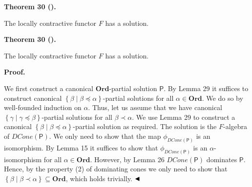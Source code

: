 \documentclass[10pt,a4paper]{article}
\begin{document}
 
 
\par\medskip\noindent\textbf{Theorem 30 ().}\par
 
 
The locally contractive functor $F$ has a solution.\par
 
 
 

 
\par\medskip\noindent\textbf{Theorem 30 ().}\par
 
 
The locally contractive functor $F$ has a solution.\par
 
 

 
 

 
\par\medskip\noindent\textbf{Proof.}\par
 
 
We first construct a canonical $\mathbf{Ord}$-partial solution $\boldsymbol{\mathsf{P}}$. By Lemma 29 it suffices to construct canonical $\left\{\beta\middle|\beta\preceq\alpha\right\}$-partial solutions for all $\alpha\in\mathbf{Ord}$. We do so by well-founded induction on $\alpha$. Thus, let us assume that we have canonical $\left\{\gamma\middle|\gamma\preceq\beta\right\}$-partial solutions for all $\beta\prec\alpha$. We use Lemma 29 to construct a canonical $\left\{\beta\middle|\beta\preceq\alpha\right\}$-partial solution as required. The solution is the $F$-algebra of $\mathit{DCone}(\boldsymbol{\mathsf{P}})$. We only need to show that the map $\phi_{\mathit{DCone}(\boldsymbol{\mathsf{P}})}$ is an isomorphism. By Lemma 15 it suffices to show that $\phi_{\mathit{DCone}(\boldsymbol{\mathsf{P}})}$ is an $\alpha$-isomorphism for all $\alpha\in\mathbf{Ord}$. However, by Lemma 26 $\mathit{DCone}(\boldsymbol{\mathsf{P}})$ dominates $\boldsymbol{\mathsf{P}}$. Hence, by the property (2) of dominating cones we only need to show that $\left\{\beta\middle|\beta\prec\alpha\right\}\subseteq\mathbf{Ord}$, which holds trivially. $\hfill\blacktriangleleft$\par
 
\end{document}
